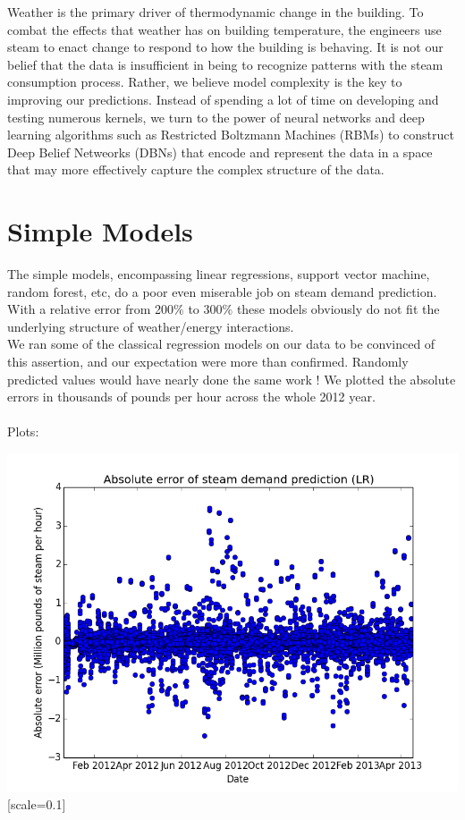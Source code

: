 \documentclass{article} %
\begin{document}
\begin{Introduction}
\noindent
Weather is the primary driver of thermodynamic change in the building. To combat the effects that weather has on building temperature, the engineers use steam to enact change to respond to how the building is behaving. It is not our belief that the data is insufficient in being to recognize patterns with the steam consumption process. Rather, we believe model complexity is the key to improving our predictions. Instead of spending a lot of time on developing and testing numerous kernels, we turn to the power of neural networks and deep learning algorithms such as Restricted Boltzmann Machines (RBMs) to construct Deep Belief Netweorks (DBNs) that encode and represent the data in a space that may more effectively capture the complex structure of the data.
\end{Introduction}



\vspace{-.2cm}
\section{Simple Models}
\vspace{-.2cm}

The simple models, encompassing linear regressions, support vector machine, random forest, etc, do a poor even miserable job on steam demand prediction. With a relative error from 200$\%$  to 300$\%$ these models obviously do not fit the underlying structure of weather/energy interactions. 
\\We ran some of the classical regression models on our data to be convinced of this assertion, and our expectation were more than confirmed. Randomly predicted values would have nearly done the same work ! We plotted the absolute errors in thousands of pounds per hour across the whole 2012 year.
\\
\\Plots:

\begin{center}
\includegraphics{LR_error}[scale=0.1]
\end{center}
\end{document}
